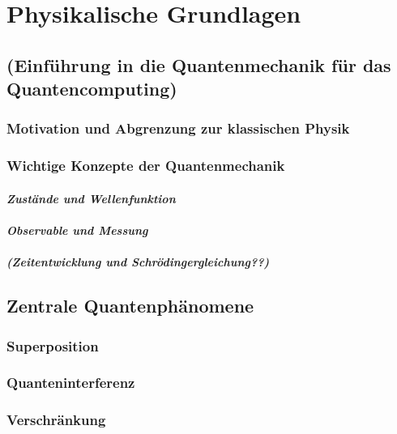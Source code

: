 \chapter{Physikalische Grundlagen}
\label{physics} %



\section{(Einführung in die Quantenmechanik für das Quantencomputing)}
\subsection{Motivation und Abgrenzung zur klassischen Physik }
\subsection{Wichtige Konzepte der Quantenmechanik }
\subsubsection{\textit{\textit{Zustände und Wellenfunktion} }}
\subsubsection{\textit{Observable und Messung}} 
\subsubsection{\textit{(Zeitentwicklung und Schrödingergleichung??)} }
\section{Zentrale Quantenphänomene }
\subsection{Superposition }
\subsection{Quanteninterferenz}
\subsection{Verschränkung }
